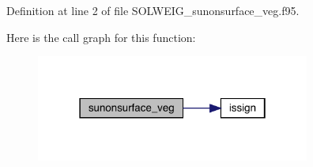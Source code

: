 Definition at line 2 of file S\+O\+L\+W\+E\+I\+G\+\_\+sunonsurface\+\_\+veg.\+f95.

Here is the call graph for this function\+:\nopagebreak
\begin{figure}[H]
\begin{center}
\leavevmode
\includegraphics[width=255pt]{_s_o_l_w_e_i_g__sunonsurface__veg_8f95_ace4703fb49ca4327e73e8070420cd8ad_cgraph}
\end{center}
\end{figure}

